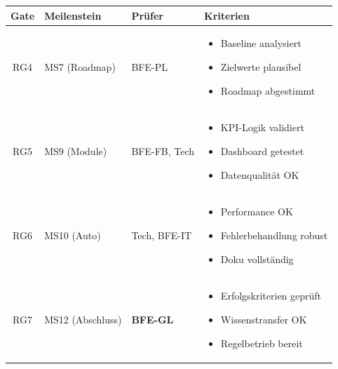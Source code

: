 \documentclass[11pt,a4paper]{article}
\begin{document}
\begin{tabular}{c l l p{5cm}}
\toprule
\textbf{Gate} & \textbf{Meilenstein} & \textbf{Prüfer} & \textbf{Kriterien}\\
\midrule
\rowcolor{falightgray}
RG4 & MS7 (Roadmap) & BFE-PL &
    \begin{minipage}[t]{5cm}
    \vspace{0.1cm}
    \begin{itemize}[leftmargin=*, nosep, font=\small]
        \item Baseline analysiert
        \item Zielwerte plausibel
        \item Roadmap abgestimmt
    \end{itemize}
    \vspace{0.1cm}
    \end{minipage}\\

RG5 & MS9 (Module) & BFE-FB, Tech &
    \begin{minipage}[t]{5cm}
    \vspace{0.1cm}
    \begin{itemize}[leftmargin=*, nosep, font=\small]
        \item KPI-Logik validiert
        \item Dashboard getestet
        \item Datenqualität OK
    \end{itemize}
    \vspace{0.1cm}
    \end{minipage}\\

\rowcolor{falightgray}
RG6 & MS10 (Auto) & Tech, BFE-IT &
    \begin{minipage}[t]{5cm}
    \vspace{0.1cm}
    \begin{itemize}[leftmargin=*, nosep, font=\small]
        \item Performance OK
        \item Fehlerbehandlung robust
        \item Doku vollständig
    \end{itemize}
    \vspace{0.1cm}
    \end{minipage}\\

RG7 & MS12 (Abschluss) & \textbf{BFE-GL} &
    \begin{minipage}[t]{5cm}
    \vspace{0.1cm}
    \begin{itemize}[leftmargin=*, nosep, font=\small]
        \item Erfolgskriterien geprüft
        \item Wissenstransfer OK
        \item Regelbetrieb bereit
    \end{itemize}
    \vspace{0.1cm}
    \end{minipage}\\

\bottomrule
\end{tabular}
\end{document}
